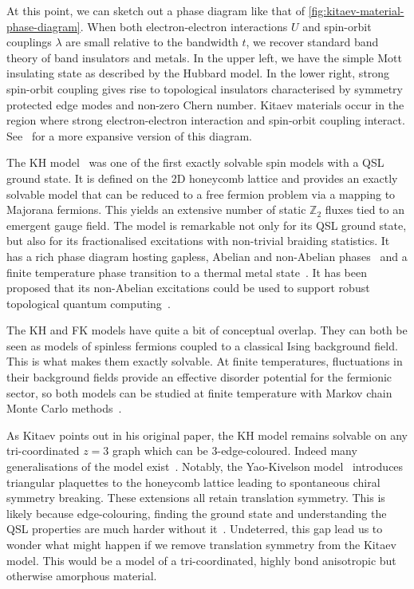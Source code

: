 At this point, we can sketch out a phase diagram like that of \cref{fig:kitaev-material-phase-diagram}. When both electron-electron interactions \(U\) and spin-orbit couplings \(\lambda\) are small relative to the bandwidth \(t\), we recover standard band theory of band insulators and metals. In the upper left, we have the simple Mott insulating state as described by the Hubbard model. In the lower right, strong spin-orbit coupling gives rise to topological insulators characterised by symmetry protected edge modes and non-zero Chern number. Kitaev materials occur in the region where strong electron-electron interaction and spin-orbit coupling interact. See~\autocite{witczak-krempaCorrelatedQuantumPhenomena2014} for a more expansive version of this diagram.

The KH model~\autocite{kitaevAnyonsExactlySolved2006} was one of the first exactly solvable spin models with a QSL ground state. It is defined on the 2D honeycomb lattice and provides an exactly solvable model that can be reduced to a free fermion problem via a mapping to Majorana fermions. This yields an extensive number of static \(\mathbb Z_2\) fluxes tied to an emergent gauge field. The model is remarkable not only for its QSL ground state, but also for its fractionalised excitations with non-trivial braiding statistics. It has a rich phase diagram hosting gapless, Abelian and non-Abelian phases~\autocite{knolleDynamicsFractionalizationQuantum2015} and a finite temperature phase transition to a thermal metal state~\autocite{selfThermallyInducedMetallic2019}. It has been proposed that its non-Abelian excitations could be used to support robust topological quantum computing~\autocite{kitaev_fault-tolerant_2003,freedmanTopologicalQuantumComputation2003,nayakNonAbelianAnyonsTopological2008}.

The KH and FK models have quite a bit of conceptual overlap. They can both be seen as models of spinless fermions coupled to a classical Ising background field. This is what makes them exactly solvable. At finite temperatures, fluctuations in their background fields provide an effective disorder potential for the fermionic sector, so both models can be studied at finite temperature with Markov chain Monte Carlo methods~\autocite{antipovInteractionTunedAndersonMott2016,selfThermallyInducedMetallic2019}.

As Kitaev points out in his original paper, the KH model remains solvable on any tri-coordinated \(z=3\) graph which can be 3-edge-coloured. Indeed many generalisations of the model exist~\autocite{Baskaran2007,Baskaran2008,Nussinov2009,OBrienPRB2016,hermanns2015weyl}. Notably, the Yao-Kivelson model~\autocite{yaoExactChiralSpin2007} introduces triangular plaquettes to the honeycomb lattice leading to spontaneous chiral symmetry breaking. These extensions all retain translation symmetry. This is likely because edge-colouring, finding the ground state and understanding the QSL properties are much harder without it~\autocite{eschmann2019thermodynamics,Peri2020}. Undeterred, this gap lead us to wonder what might happen if we remove translation symmetry from the Kitaev model. This would be a model of a tri-coordinated, highly bond anisotropic but otherwise amorphous material.

